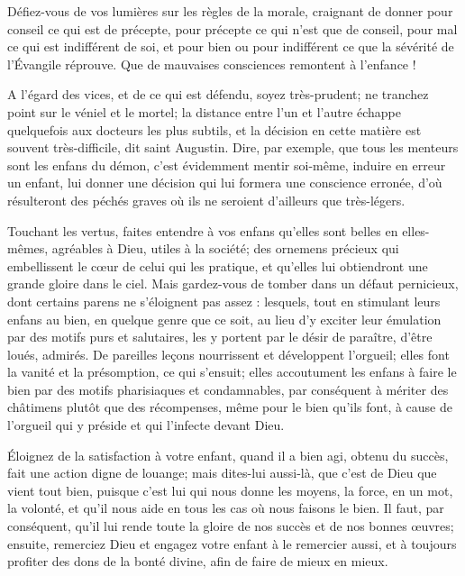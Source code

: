 \documentclass[instructions.tex]{subfiles}
\begin{document}
Défiez-vous de vos lumières sur les règles de la morale, craignant de donner pour conseil ce qui est de précepte, pour précepte ce qui n’est que de conseil, pour mal ce qui est indifférent de soi, et pour bien ou pour indifférent ce que la sévérité de l’Évangile réprouve. Que de mauvaises consciences remontent à l’enfance !
 
\secundo A l’égard des vices, et de ce qui est défendu, soyez très-prudent; ne tranchez point sur le véniel et le mortel; la distance entre l’un et l’autre échappe quelquefois aux docteurs les plus subtils, et la décision en cette matière est souvent très-difficile, dit saint Augustin. Dire, par exemple, que tous les menteurs sont les enfans du démon, c’est évidemment mentir soi-même, induire en erreur un enfant, lui donner une décision qui lui formera une conscience erronée, d’où résulteront des péchés graves où ils ne seroient d’ailleurs que très-légers.
 
Touchant les vertus, faites entendre à vos enfans qu’elles sont belles en elles-mêmes, agréables à Dieu, utiles à la société; des ornemens précieux qui embellissent le cœur de celui qui les pratique, et qu’elles lui obtiendront une grande gloire dans le ciel. Mais gardez-vous de tomber dans un défaut pernicieux, dont certains parens ne s’éloignent pas assez : lesquels, tout en stimulant leurs enfans au bien, en quelque genre que ce soit, au lieu d’y exciter leur émulation par des motifs purs et salutaires, les y portent par le désir de paraître, d’être loués, admirés. De pareilles leçons nourrissent et développent l’orgueil; elles font la vanité et la présomption, ce qui s’ensuit; elles accoutument les enfans à faire le bien par des motifs pharisiaques et condamnables, par conséquent à mériter des châtimens plutôt que des récompenses, même pour le bien qu’ils font, à cause de l’orgueil qui y préside et qui l’infecte devant Dieu.
 
Éloignez de la satisfaction à votre enfant, quand il a bien agi, obtenu du succès, fait une action digne de louange; mais dites-lui aussi-là, que c’est de Dieu que vient tout bien, puisque c’est lui qui nous donne les moyens, la force, en un mot, la volonté, et qu’il nous aide en tous les cas où nous faisons le bien. Il faut, par conséquent, qu’il lui rende toute la gloire de nos succès et de nos bonnes œuvres; ensuite, remerciez Dieu et engagez votre enfant à le remercier aussi, et à toujours profiter des dons de la bonté divine, afin de faire de mieux en mieux.
 
\end{document}
